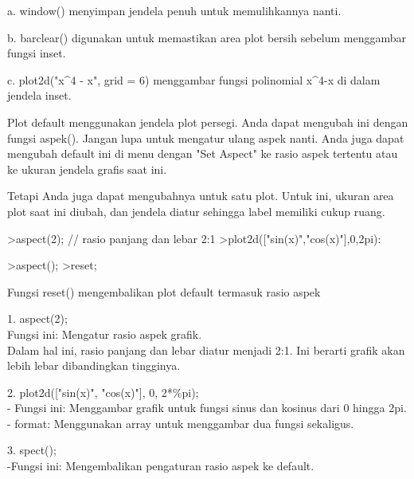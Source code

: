 \documentclass{article}
\begin{document}
\begin{eulernotebook}
\begin{eulercomment}
\begin{eulercomment}
\begin{eulercomment}
\begin{eulercomment}
\begin{eulercomment}
a. window() menyimpan jendela penuh untuk memulihkannya nanti.

b. barclear() digunakan untuk memastikan area plot bersih sebelum
menggambar fungsi inset.

c. plot2d("x\textasciicircum{}4 - x", grid = 6) menggambar fungsi polinomial x\textasciicircum{}4-x di
dalam jendela inset.
\end{eulercomment}
\begin{eulercomment}

\end{eulercomment}
\begin{eulercomment}
Plot default menggunakan jendela plot persegi. Anda dapat mengubah ini
dengan fungsi aspek(). Jangan lupa untuk mengatur ulang aspek nanti.
Anda juga dapat mengubah default ini di menu dengan "Set Aspect" ke
rasio aspek tertentu atau ke ukuran jendela grafis saat ini.

Tetapi Anda juga dapat mengubahnya untuk satu plot. Untuk ini, ukuran
area plot saat ini diubah, dan jendela diatur sehingga label memiliki
cukup ruang.
\end{eulercomment}
\begin{eulerprompt}
>aspect(2); // rasio panjang dan lebar 2:1
>plot2d(["sin(x)","cos(x)"],0,2pi):
\end{eulerprompt}
\begin{eulerprompt}
>aspect();
>reset;
\end{eulerprompt}
\begin{eulercomment}
Fungsi reset() mengembalikan plot default termasuk rasio aspek

\end{eulercomment}
\eulersubheading{}
\begin{eulercomment}
1. aspect(2);\\
Fungsi ini: Mengatur rasio aspek grafik.\\
Dalam hal ini, rasio panjang dan lebar diatur menjadi 2:1. Ini berarti
grafik akan lebih lebar dibandingkan tingginya.

2. plot2d(["sin(x)", "cos(x)"], 0, 2*\%pi);\\
- Fungsi ini: Menggambar grafik untuk fungsi sinus dan kosinus dari 0
hingga 2pi.\\
- format: Menggunakan array untuk menggambar dua fungsi sekaligus.

3. spect();\\
-Fungsi ini: Mengembalikan pengaturan rasio aspek ke default.


\end{eulercomment}
\end{eulercomment}
\end{eulercomment}
\end{eulercomment}
\end{eulercomment}
\end{eulernotebook}
\end{document}
